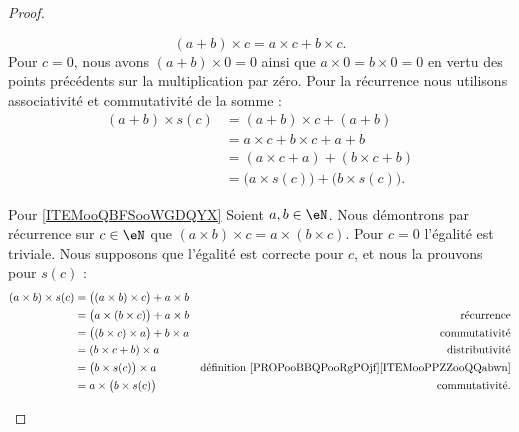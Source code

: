 \begin{proof}
\begin{subproof}
		\begin{equation}
			(a+b)\times c=a\times c+b\times c.
		\end{equation}
		Pour \( c=0\), nous avons \( (a+b)\times 0=0\) ainsi que \( a\times 0=b\times 0=0\) en vertu des points précédents sur la multiplication par zéro. Pour la récurrence nous utilisons associativité et commutativité de la somme :
		\begin{subequations}
			\begin{align}
				(a+b)\times s(c) & =(a+b)\times c+(a+b)                                \\
				                 & =a\times c+b\times c+a+b                            \\
				                 & =(a\times c +a)+(b\times c+b)                       \\
				                 & =\big( a\times s(c) \big)+\big( b\times s(c) \big).
			\end{align}
		\end{subequations}
		\item[Pour \ref{ITEMooQBFSooWGDQYX}]
		Soient \( a,b\in \eN\). Nous démontrons par récurrence sur \( c\in \eN\) que \( (a\times b)\times c=a\times (b\times c)\). Pour \( c=0\) l'égalité est triviale. Nous supposons que l'égalité est correcte pour \( c\), et nous la prouvons pour \( s(c)\) :
		\begin{subequations}
			\begin{align}
				(a\times b)\times s(c) & =\big( (a\times b)\times c \big)+a\times b                                                                      \\
				                       & =\big( a\times (b\times c) \big)+a\times b & \text{récurrence}                                                  \\
				                       & =\big( (b\times c)\times a \big)+b\times a & \text{commutativité}                                               \\
				                       & =(b\times c+b)\times a                     & \text{distributivité}                                              \\
				                       & =\big( b\times s(c) \big)\times a          & \text{définition \ref{PROPooBBQPooRgPOjf}\ref{ITEMooPPZZooQQabwn}} \\
				                       & =a\times \big( b\times s(c) \big)          & \text{commutativité}.
			\end{align}
		\end{subequations}
	\end{subproof}
\end{proof}

